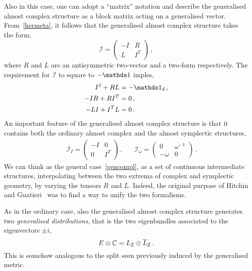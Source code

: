 \documentclass[debug]{phd}
\begin{document}
						Also in this case, one can adopt a ``matrix'' notation and describe the generalised almost complex structure as a block matrix acting on a generalised vector.
						From~\eqref{hermeta}, it follows that the generalised almost complex structure takes the form,
								\begin{equation}\label{gencompl}
									\mathcal{I} = \begin{pmatrix}
												- I	&	R \\
												L	& 	I^T
												\end{pmatrix} \, , 
								\end{equation}
						where $R$ and $L$ are an antisymmetric two-vector and a two-form respectively. 
						The requirement for $\mathcal{I}$ to square to $-\id$ imples,
								\begin{align}
									I^2 + RL &= -\id_d \, , \\
									-I R + R I^T &= 0 \, , \\
									-LI + I^T L &= 0 \, .
								\end{align}
						An important feature of the generalised almost complex structure is that it contains both the ordinary almost complex and the almost symplectic structures,
								\begin{align}
									&&	\mathcal{I}_I = \begin{pmatrix}
												- I	&	0 \\
												0	& 	I^T
												\end{pmatrix} \, ,	&&	\mathcal{I}_\omega = \begin{pmatrix}
												0		&	\omega^{-1} \\
												-\omega	& 	0
												\end{pmatrix} \, .
								\end{align}
						We can think as the general case~\eqref{gencompl}, as a set of continuous intermediate structures, interpolating between the two extrema of complex and symplectic geometry, by varying the tensors $R$ and $L$.
						Indeed, the original purpose of Hitchin and Guatieri~\cite{HitchinLagrangian, gualtphd} was to find a way to unify the two formalisms.
						
						As in the ordinary case, also the generalised almost complex structure generates two \emph{generalised distributions}, that is the two eigenbundles associated to the eigenvectors $\pm i$,
								\begin{equation}
									E \otimes \mathbb{C} = L_\mathcal{I} \oplus \overline{L}_\mathcal{I} \, .
								\end{equation}
						This is somehow analogous to the split seen previously induced by the generalised metric.
						
\end{document}
